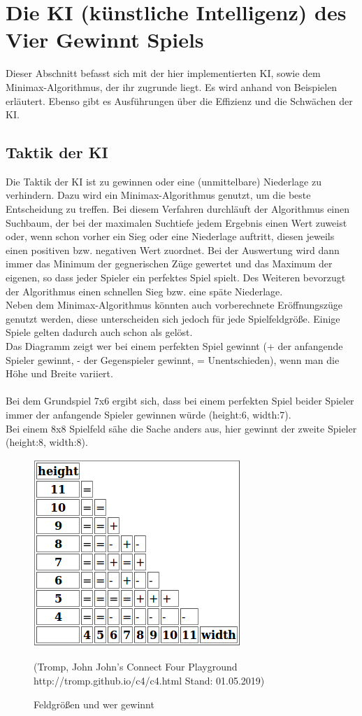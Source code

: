 \documentclass[12pt,a4paper]{article}
\begin{document}
	\section{Die KI (künstliche Intelligenz) des Vier Gewinnt Spiels}
	Dieser Abschnitt befasst sich mit der hier implementierten KI, sowie dem Minimax-Algorithmus, der ihr zugrunde liegt. Es wird anhand von Beispielen erläutert. Ebenso gibt es Ausführungen über die Effizienz und die Schwächen der KI.\\
	\subsection{Taktik der KI}
	Die Taktik der KI ist zu gewinnen oder eine (unmittelbare) Niederlage zu verhindern. Dazu wird ein Minimax-Algorithmus genutzt, um die beste Entscheidung zu treffen. Bei diesem Verfahren durchläuft der Algorithmus einen Suchbaum, der bei der maximalen Suchtiefe jedem Ergebnis einen Wert zuweist oder, wenn schon vorher ein Sieg oder eine Niederlage auftritt, diesen jeweils einen positiven bzw. negativen Wert zuordnet. Bei der Auswertung wird dann immer das Minimum der gegnerischen Züge gewertet und das Maximum der eigenen, so dass jeder Spieler ein \glqq perfektes\grqq{} Spiel spielt. Des Weiteren bevorzugt der Algorithmus einen schnellen Sieg bzw. eine späte Niederlage.\\
	Neben dem Minimax-Algorithmus könnten auch vorberechnete Eröffnungszüge genutzt werden, diese unterscheiden sich jedoch für jede Spielfeldgröße. Einige Spiele gelten dadurch auch schon als gelöst.\\
	Das Diagramm zeigt wer bei einem perfekten Spiel gewinnt (+ der anfangende Spieler gewinnt, - der Gegenspieler gewinnt, = Unentschieden), wenn man die Höhe und Breite variiert.\\\\ Bei dem Grundspiel 7x6 ergibt sich, dass bei einem perfekten Spiel beider Spieler immer der anfangende Spieler gewinnen würde (height:6, width:7).\\
	Bei einem 8x8 Spielfeld sähe die Sache anders aus, hier gewinnt der zweite Spieler (height:8, width:8).
	\begin{figure}[h]
		\centering
		\includegraphics[width=0.5\linewidth, height=0.3\textheight]{w-h-viergew}
		\caption{Feldgrößen und wer gewinnt}
		\label{fig:w-h-viergew}
		(Tromp, John  \glqq John's Connect Four Playground\grqq{} http://tromp.github.io/c4/c4.html Stand: 01.05.2019)
	\end{figure}
\newpage
\end{document}
